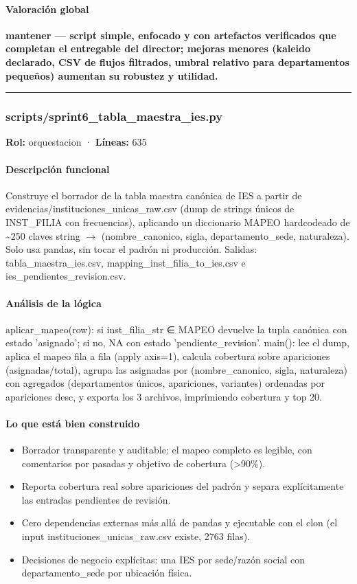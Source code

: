 \paragraph{Valoración global}
\textbf{mantener --- script simple, enfocado y con artefactos verificados que completan el entregable del director; mejoras menores (kaleido declarado, CSV de flujos filtrados, umbral relativo para departamentos pequeños) aumentan su robustez y utilidad.}

\medskip
\hrule

\subsubsection{scripts/sprint6\_tabla\_maestra\_ies.py}
\textbf{Rol:} orquestacion · \textbf{Líneas:} 635

\paragraph{Descripción funcional}
Construye el borrador de la tabla maestra canónica de IES a partir de evidencias/instituciones\_unicas\_raw.csv (dump de strings únicos de INST\_FILIA con frecuencias), aplicando un diccionario MAPEO hardcodeado de \textasciitilde{}250 claves string $\rightarrow$ (nombre\_canonico, sigla, departamento\_sede, naturaleza). Solo usa pandas, sin tocar el padrón ni producción. Salidas: tabla\_maestra\_ies.csv, mapping\_inst\_filia\_to\_ies.csv e ies\_pendientes\_revision.csv.

\paragraph{Análisis de la lógica}
aplicar\_mapeo(row): si inst\_filia\_str ∈ MAPEO devuelve la tupla canónica con estado 'asignado'; si no, NA con estado 'pendiente\_revision'. main(): lee el dump, aplica el mapeo fila a fila (apply axis=1), calcula cobertura sobre apariciones (asignadas/total), agrupa las asignadas por (nombre\_canonico, sigla, naturaleza) con agregados (departamentos únicos, apariciones, variantes) ordenadas por apariciones desc, y exporta los 3 archivos, imprimiendo cobertura y top 20.

\paragraph{Lo que está bien construido}
\begin{itemize}
  \item Borrador transparente y auditable: el mapeo completo es legible, con comentarios por pasadas y objetivo de cobertura (>90\%).
  \item Reporta cobertura real sobre apariciones del padrón y separa explícitamente las entradas pendientes de revisión.
  \item Cero dependencias externas más allá de pandas y ejecutable con el clon (el input instituciones\_unicas\_raw.csv existe, 2763 filas).
  \item Decisiones de negocio explícitas: una IES por sede/razón social con departamento\_sede por ubicación física.
\end{itemize}


